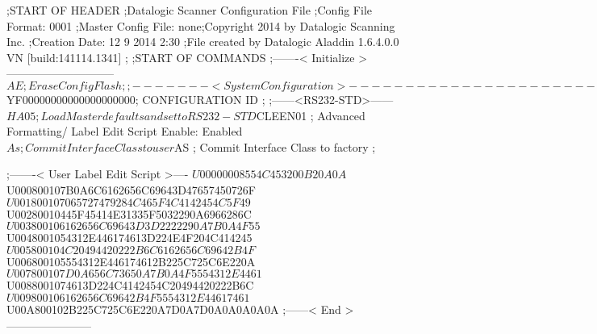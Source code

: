 ;START OF HEADER
;Datalogic Scanner Configuration File
;Config File Format: 0001
;Master Config File: none;Copyright 2014 by Datalogic Scanning Inc.
;Creation Date: 12 9 2014 2:30
;File created by Datalogic Aladdin 1.6.4.0.0 VN [build:141114.1341]
;
;START OF COMMANDS
;-------< Initialize >-----------------------------
$AE                 ; Erase Config Flash
;
;-------< System Configuration >-------------------------------
$YF00000000000000000000; CONFIGURATION ID
;
;------<RS232-STD>------
$HA05               ; Load Master defaults and set to RS232-STD
$CLEEN01            ; Advanced Formatting/ Label Edit Script Enable: Enabled
$As                 ; Commit Interface Class to user
$AS                 ; Commit Interface Class to factory
;

;-------< User Label Edit Script >----
$U00000008554C453200B20A0A
$U000800107B0A6C6162656C69643D47657450726F
$U001800107065727479284C465F4C4142454C5F49
$U00280010445F45414E31335F5032290A6966286C
$U003800106162656C69643D3D2222290A7B0A4F55
$U0048001054312E446174613D224E4F204C414245
$U005800104C20494420222B6C6162656C69642B4F
$U006800105554312E446174612B225C725C6E220A
$U007800107D0A656C73650A7B0A4F5554312E4461
$U0088001074613D224C4142454C20494420222B6C
$U009800106162656C69642B4F5554312E44617461
$U00A800102B225C725C6E220A7D0A7D0A0A0A0A0A
;------< End >-----------------------
